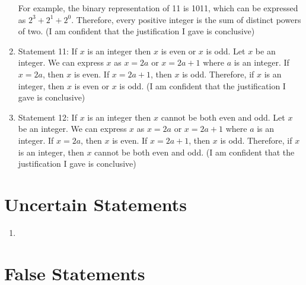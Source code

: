\documentclass{article}
\begin{document}
\begin{enumerate}
          For example, the binary representation of 11 is 1011, which can be expressed as \(2^3 + 2^1 + 2^0\).\newline
          Therefore, every positive integer is the sum of distinct powers of two.\newline
          (I am confident that the justification I gave is conclusive)
    \item Statement 11: If $x$ is an integer then $x$ is even or $x$ is odd.\newline
          Let \(x\) be an integer. We can express \(x\) as \(x = 2a\) or \(x = 2a + 1\) where \(a\) is an integer.\newline
          If \(x = 2a\), then \(x\) is even. If \(x = 2a + 1\), then \(x\) is odd.\newline
          Therefore, if \(x\) is an integer, then \(x\) is even or \(x\) is odd.\newline
          (I am confident that the justification I gave is conclusive)
    \item Statement 12: If $x$ is an integer then $x$ cannot be both even and odd.\newline
          Let \(x\) be an integer. We can express \(x\) as \(x = 2a\) or \(x = 2a + 1\) where \(a\) is an integer.\newline
          If \(x = 2a\), then \(x\) is even. If \(x = 2a + 1\), then \(x\) is odd.\newline
          Therefore, if \(x\) is an integer, then \(x\) cannot be both even and odd.\newline
          (I am confident that the justification I gave is conclusive)
\end{enumerate}

\section{Uncertain Statements}

\begin{enumerate}
    \item
\end{enumerate}

\section{False Statements}
\end{document}

